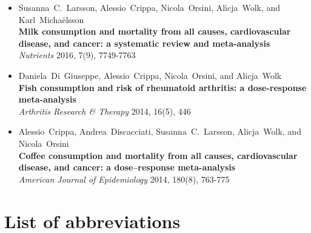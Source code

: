 \documentclass[11pt,a4paper,twoside,openany]{book}\usepackage{knitr}
\makeatletter
\def\cleardoublepage{\clearpage\if@twoside
\ifodd\c@page
\else\hbox{}\thispagestyle{empty}\newpage
\if@twocolumn\hbox{}\newpage\fi\fi\fi}
\makeatother
\begin{document}
{{\begin{itemize}
\item Susanna~C.~Larsson, Alessio~Crippa, Nicola~Orsini, Alicja~Wolk, and Karl~Micha{\"e}lsson \\ \textbf{Milk consumption and mortality from all causes, cardiovascular disease, and cancer: a systematic review and meta-analysis} \\ \textit{Nutrients} 2016, 7(9), 7749-7763
\item Daniela~Di~Giuseppe, Alessio~Crippa, Nicola~Orsini, and Alicja~Wolk \\ \textbf{Fish consumption and risk of rheumatoid arthritis: a dose-response meta-analysis} \\ \textit{Arthritis Research \& Therapy} 2014, 16(5), 446
\item Alessio~Crippa, Andrea~Discacciati, Susanna~C.~Larsson, Alicja~Wolk, and Nicola~Orsini \\ \textbf{Coffee consumption and mortality from all causes, cardiovascular disease, and cancer: a dose--response meta-analysis} \\ \textit{American Journal of Epidemiology} 2014, 180(8), 763-775
\end{itemize}
\cleardoublepage
{}
\tableofcontents
{} 

%

\chapter*{List of abbreviations}
\begin{tabular}{ll}


\end{tabular}}}
\end{document}
